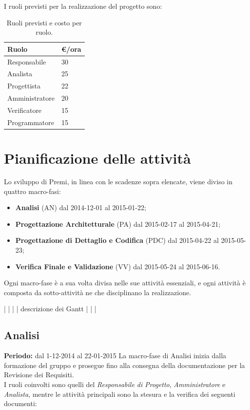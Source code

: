 I ruoli previsti per la realizzazione del progetto sono:

\begin{table}[h]
\begin{center}
\begin{tabular}{|l|l|}
\hline
\textbf{Ruolo} & \textbf{€/ora} \\
\hline
Responsabile & 30 \\
Analista & 25 \\
Progettista & 22 \\
Amministratore & 20 \\
Verificatore & 15 \\
Programmatore & 15 \\
\hline
\end{tabular}
\caption{Ruoli previsti e costo per ruolo.}
\end{center}
\end{table}

\newpage

\section{Pianificazione delle attività}
Lo sviluppo di Premi, in linea con le scadenze sopra elencate, viene diviso in quattro macro-fasi:

\begin{itemize}
\item \textbf{Analisi} (AN) dal 2014-12-01 al 2015-01-22;
\item \textbf{Progettazione Architetturale} (PA) dal 2015-02-17 al 2015-04-21;
\item \textbf{Progettazione di Dettaglio e Codifica} (PDC) dal 2015-04-22 al 2015-05-23;
\item \textbf{Verifica Finale e Validazione} (VV) dal 2015-05-24 al 2015-06-16.
\end{itemize}

Ogni macro-fase è a sua volta divisa nelle sue attività essenziali, e ogni attività è composta da sotto-attività ne che disciplinano la realizzazione.

|
|
|
|  descrizione dei Gantt
|
|
|


\subsection{Analisi}
\textbf{Periodo:} dal 1-12-2014 al 22-01-2015
La macro-fase di Analisi inizia dalla formazione del gruppo e prosegue fino alla consegna della documentazione per la Revisione dei Requisiti. \\
I ruoli coinvolti sono quelli del \textit{Responsabile di Progetto}, \textit{Amministratore} e \textit{Analista}, mentre le attività principali sono la stesura e la verifica dei seguenti documenti:

